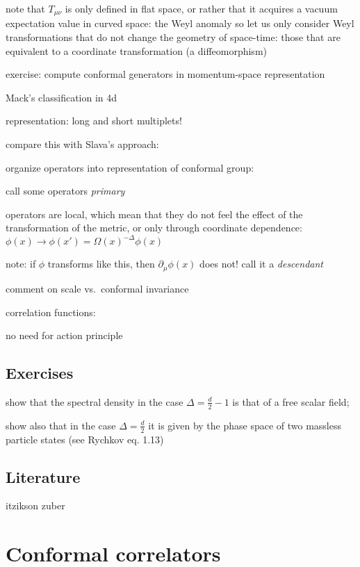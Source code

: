 \documentclass[a4paper,12pt]{article}
\numberwithin{equation}{section}
\begin{document}
note that $T_{\mu\nu}$ is only defined in flat space, or rather that it acquires a vacuum expectation value in curved space: the Weyl anomaly
so let us only consider Weyl transformations that do not change the geometry of space-time: those that are equivalent to a coordinate transformation (a diffeomorphism)


exercise: compute conformal generators in momentum-space representation


Mack's classification in 4d


representation: long and short multiplets!




compare this with Slava's approach:

organize operators into representation of conformal group:

call some operators \emph{primary}

operators are local, which mean that they do not feel the effect of the transformation of the metric, or only through coordinate dependence:
$\phi(x) \to \phi(x') = \Omega(x)^{-\Delta} \phi(x)$

note: if $\phi$ transforms like this, then $\partial_\mu \phi(x)$ does not! call it a \emph{descendant}


comment on scale vs.~conformal invariance

correlation functions:

no need for action principle



\subsection{Exercises}

show that the spectral density in the case $\Delta = \frac{d}{2} - 1$ is that of a free scalar field;

show also that in the case $\Delta = \frac{d}{2}$ it is given by the phase space of two massless particle states (see Rychkov eq. 1.13)


\subsection{Literature}

itzikson zuber


\section{Conformal correlators}
\end{document}
